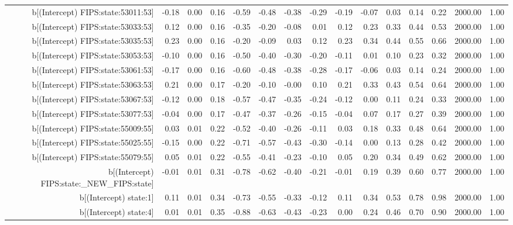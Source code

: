 \begin{table}[ht]
\begin{tabular}{rrrrrrrrrrrrrrr}
  b[(Intercept) FIPS:state:53011:53] & -0.18 & 0.00 & 0.16 & -0.59 & -0.48 & -0.38 & -0.29 & -0.19 & -0.07 & 0.03 & 0.14 & 0.22 & 2000.00 & 1.00 \\ 
  b[(Intercept) FIPS:state:53033:53] & 0.12 & 0.00 & 0.16 & -0.35 & -0.20 & -0.08 & 0.01 & 0.12 & 0.23 & 0.33 & 0.44 & 0.53 & 2000.00 & 1.00 \\ 
  b[(Intercept) FIPS:state:53035:53] & 0.23 & 0.00 & 0.16 & -0.20 & -0.09 & 0.03 & 0.12 & 0.23 & 0.34 & 0.44 & 0.55 & 0.66 & 2000.00 & 1.00 \\ 
  b[(Intercept) FIPS:state:53053:53] & -0.10 & 0.00 & 0.16 & -0.50 & -0.40 & -0.30 & -0.20 & -0.11 & 0.01 & 0.10 & 0.23 & 0.32 & 2000.00 & 1.00 \\ 
  b[(Intercept) FIPS:state:53061:53] & -0.17 & 0.00 & 0.16 & -0.60 & -0.48 & -0.38 & -0.28 & -0.17 & -0.06 & 0.03 & 0.14 & 0.24 & 2000.00 & 1.00 \\ 
  b[(Intercept) FIPS:state:53063:53] & 0.21 & 0.00 & 0.17 & -0.20 & -0.10 & -0.00 & 0.10 & 0.21 & 0.33 & 0.43 & 0.54 & 0.64 & 2000.00 & 1.00 \\ 
  b[(Intercept) FIPS:state:53067:53] & -0.12 & 0.00 & 0.18 & -0.57 & -0.47 & -0.35 & -0.24 & -0.12 & 0.00 & 0.11 & 0.24 & 0.33 & 2000.00 & 1.00 \\ 
  b[(Intercept) FIPS:state:53077:53] & -0.04 & 0.00 & 0.17 & -0.47 & -0.37 & -0.26 & -0.15 & -0.04 & 0.07 & 0.17 & 0.27 & 0.39 & 2000.00 & 1.00 \\ 
  b[(Intercept) FIPS:state:55009:55] & 0.03 & 0.01 & 0.22 & -0.52 & -0.40 & -0.26 & -0.11 & 0.03 & 0.18 & 0.33 & 0.48 & 0.64 & 2000.00 & 1.00 \\ 
  b[(Intercept) FIPS:state:55025:55] & -0.15 & 0.00 & 0.22 & -0.71 & -0.57 & -0.43 & -0.30 & -0.14 & 0.00 & 0.13 & 0.28 & 0.42 & 2000.00 & 1.00 \\ 
  b[(Intercept) FIPS:state:55079:55] & 0.05 & 0.01 & 0.22 & -0.55 & -0.41 & -0.23 & -0.10 & 0.05 & 0.20 & 0.34 & 0.49 & 0.62 & 2000.00 & 1.00 \\ 
  b[(Intercept) FIPS:state:\_NEW\_FIPS:state] & -0.01 & 0.01 & 0.31 & -0.78 & -0.62 & -0.40 & -0.21 & -0.01 & 0.19 & 0.39 & 0.60 & 0.77 & 2000.00 & 1.00 \\ 
  b[(Intercept) state:1] & 0.11 & 0.01 & 0.34 & -0.73 & -0.55 & -0.33 & -0.12 & 0.11 & 0.34 & 0.53 & 0.78 & 0.98 & 2000.00 & 1.00 \\ 
  b[(Intercept) state:4] & 0.01 & 0.01 & 0.35 & -0.88 & -0.63 & -0.43 & -0.23 & 0.00 & 0.24 & 0.46 & 0.70 & 0.90 & 2000.00 & 1.00 \\ 

\end{tabular}
\end{table}
